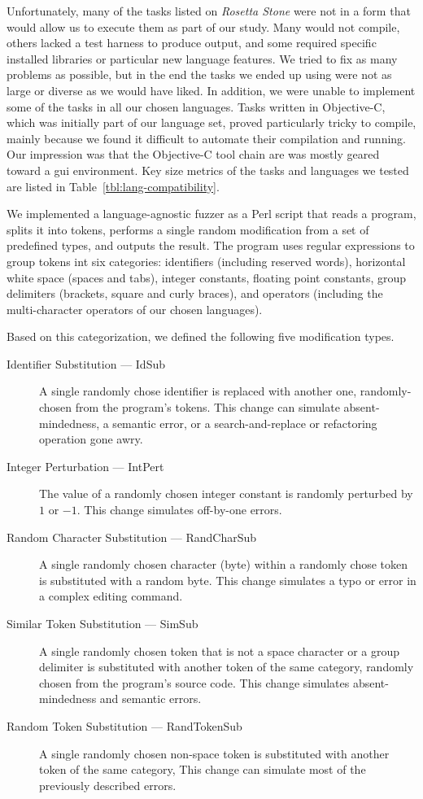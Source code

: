 \documentclass[10pt]{sigplanconf}
\begin{document}
Unfortunately, many of the tasks listed on {\em Rosetta Stone} were
not in a form that would allow us to execute them as part of our study.
Many would not compile, others lacked a test harness to produce output,
and some required specific installed libraries or particular
new language features.
We tried to fix as many problems as possible, but in the end the tasks
we ended up using were not as large or diverse as we would have liked.
In addition, we were unable to implement some of the tasks in all our
chosen languages.
Tasks written in Objective-C, which was initially part of our language set,
proved particularly tricky to compile,
mainly because we found it difficult to automate their compilation and
running.
Our impression was that the Objective-C tool chain are was
mostly geared toward a {\sc gui} environment.
Key size metrics of the tasks and languages we tested are listed in
Table~\ref{tbl:lang-compatibility}.

We implemented a language-agnostic fuzzer as a Perl script
that reads a program,
splits it into tokens,
performs a single random modification from a set of
predefined types,
and outputs the result.
The program uses regular expressions to group tokens int
six categories:
identifiers (including reserved words),
horizontal white space (spaces and tabs),
integer constants,
floating point constants,
group delimiters (brackets, square and curly braces), and
operators (including the multi-character operators of our chosen languages).

Based on this categorization,
we defined the following five modification types.
\begin{description}
\item [Identifier Substitution --- IdSub]
A single randomly chose identifier is replaced with another one,
randomly-chosen from the program's tokens.
This change can simulate absent-mindedness, a semantic error, or
a search-and-replace or refactoring operation gone awry.
\item [Integer Perturbation --- IntPert]
The value of a randomly chosen integer constant
is randomly perturbed by $1$ or $-1$.
This change simulates off-by-one errors.
\item [Random Character Substitution --- RandCharSub]
A single randomly chosen character (byte) within a randomly chose token
is substituted with a random byte.
This change simulates a typo or error in a complex editing command.
\item [Similar Token Substitution --- SimSub]
A single randomly chosen token
that is not a space character or a group delimiter
is substituted with another token of the same category,
randomly chosen from the program's source code.
This change simulates absent-mindedness and semantic errors.
\item [Random Token Substitution --- RandTokenSub]
A single randomly chosen non-space token
is substituted with another token of the same category,
This change can simulate most of the previously described errors.
\end{description}
\end{document}
